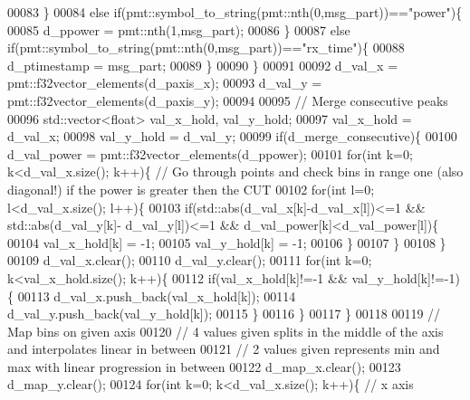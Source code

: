 \begin{DoxyCode}
00083             \}
00084             \textcolor{keywordflow}{else} \textcolor{keywordflow}{if}(pmt::symbol\_to\_string(pmt::nth(0,msg\_part))==\textcolor{stringliteral}{"power"})\{
00085                 d_ppower = pmt::nth(1,msg\_part);
00086             \}
00087             \textcolor{keywordflow}{else} \textcolor{keywordflow}{if}(pmt::symbol\_to\_string(pmt::nth(0,msg\_part))==\textcolor{stringliteral}{"rx\_time"})\{
00088                 d_ptimestamp = msg\_part;
00089             \}
00090         \}
00091         
00092         d_val_x = pmt::f32vector\_elements(d_paxis_x);
00093         d_val_y = pmt::f32vector\_elements(d_paxis_y);
00094         
00095         \textcolor{comment}{// Merge consecutive peaks}
00096         std::vector<float> val\_x\_hold, val\_y\_hold;
00097         val\_x\_hold = d_val_x;
00098         val\_y\_hold = d_val_y;
00099         \textcolor{keywordflow}{if}(d_merge_consecutive)\{
00100             d_val_power = pmt::f32vector\_elements(d_ppower);
00101             \textcolor{keywordflow}{for}(\textcolor{keywordtype}{int} k=0; k<d_val_x.size(); k++)\{ \textcolor{comment}{// Go through points and check bins in range one (also
       diagonal!) if the power is greater then the CUT}
00102                 \textcolor{keywordflow}{for}(\textcolor{keywordtype}{int} l=0; l<d_val_x.size(); l++)\{
00103                     \textcolor{keywordflow}{if}(std::abs(d_val_x[k]-d_val_x[l])<=1 && std::abs(d_val_y[k]-
      d_val_y[l])<=1 && d_val_power[k]<d_val_power[l])\{
00104                         val\_x\_hold[k] = -1;
00105                         val\_y\_hold[k] = -1;
00106                     \}
00107                 \}
00108             \}
00109             d_val_x.clear();
00110             d_val_y.clear();
00111             \textcolor{keywordflow}{for}(\textcolor{keywordtype}{int} k=0; k<val\_x\_hold.size(); k++)\{
00112                 \textcolor{keywordflow}{if}(val\_x\_hold[k]!=-1 && val\_y\_hold[k]!=-1)\{
00113                     d_val_x.push\_back(val\_x\_hold[k]);
00114                     d_val_y.push\_back(val\_y\_hold[k]);
00115                 \}
00116             \}
00117         \}
00118         
00119         \textcolor{comment}{// Map bins on given axis}
00120         \textcolor{comment}{// 4 values given splits in the middle of the axis and interpolates linear in between}
00121         \textcolor{comment}{// 2 values given represents min and max with linear progression in between}
00122         d_map_x.clear();
00123         d_map_y.clear();
00124         \textcolor{keywordflow}{for}(\textcolor{keywordtype}{int} k=0; k<d_val_x.size(); k++)\{ \textcolor{comment}{// x axis}

\end{DoxyCode}
